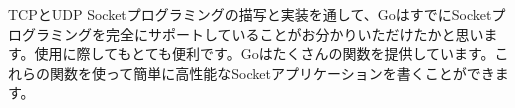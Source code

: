 TCPとUDP Socketプログラミングの描写と実装を通して、GoはすでにSocketプログラミングを完全にサポートしていることがお分かりいただけたかと思います。使用に際してもとても便利です。Goはたくさんの関数を提供しています。これらの関数を使って簡単に高性能なSocketアプリケーションを書くことができます。
